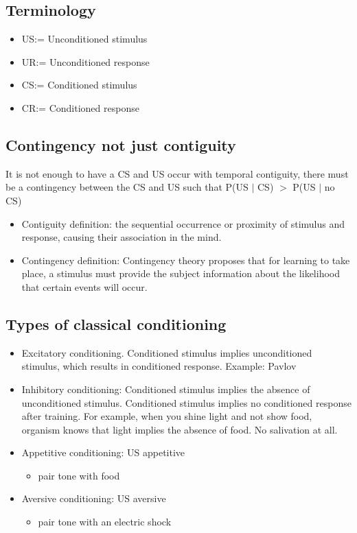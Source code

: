 \subsection{Terminology}
\begin{itemize}
    \item US:= Unconditioned stimulus
    \item UR:= Unconditioned response
    \item CS:= Conditioned stimulus
    \item CR:= Conditioned response
\end{itemize}

\subsection{Contingency not just contiguity}
It is not enough to have a CS and US occur with temporal contiguity, there must be a contingency between the CS and US such that P(US $\vert$ CS) $>$ P(US $\vert$ no CS)
\begin{itemize}
    \item Contiguity definition: the sequential occurrence or proximity of stimulus and response, causing their association in the mind.
    \item Contingency definition: 
Contingency theory proposes that for learning to take place, a stimulus must provide the subject information about the likelihood that certain events will occur.
\end{itemize}

\subsection{Types of classical conditioning}
\begin{itemize}
    \item Excitatory conditioning. Conditioned stimulus implies unconditioned stimulus, which results in conditioned response. Example: Pavlov
    \item Inhibitory conditioning: Conditioned stimulus implies the absence of unconditioned stimulus. Conditioned stimulus implies no conditioned response after training. For example, when you shine light and not show food, organism knows that light implies the absence of food. No salivation at all.
    \item Appetitive conditioning: US appetitive
    \begin{itemize}
        \item pair tone with food
    \end{itemize}
    \item Aversive conditioning: US aversive
    \begin{itemize}
        \item pair tone with an electric shock
    \end{itemize}
\end{itemize}


